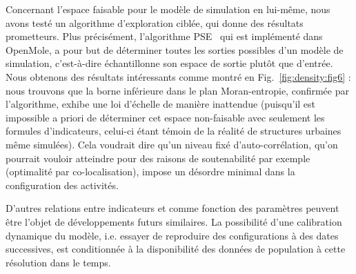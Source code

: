 {Concernant l'espace faisable pour le modèle de simulation en lui-même, nous avons testé un algorithme d'exploration ciblée, qui donne des résultats prometteurs. Plus précisément, l'algorithme PSE~\cite{10.1371/journal.pone.0138212} qui est implémenté dans OpenMole, a pour but de déterminer toutes les sorties possibles d'un modèle de simulation, c'est-à-dire échantillonne son espace de sortie plutôt que d'entrée. Nous obtenons des résultats intéressants comme montré en Fig.~\ref{fig:density:fig6} : nous trouvons que la borne inférieure dans le plan Moran-entropie, confirmée par l'algorithme, exhibe une loi d'échelle de manière inattendue (puisqu'il est impossible a priori de déterminer cet espace non-faisable avec seulement les formules d'indicateurs, celui-ci étant témoin de la réalité de structures urbaines même simulées). Cela voudrait dire qu'un niveau fixé d'auto-corrélation, qu'on pourrait vouloir atteindre pour des raisons de soutenabilité par exemple (optimalité par co-localisation), impose un désordre minimal dans la configuration des activités.

D'autres relations entre indicateurs et comme fonction des paramètres peuvent être l'objet de développements futurs similaires. La possibilité d'une calibration dynamique du modèle, i.e. essayer de reproduire des configurations à des dates successives, est conditionnée à la disponibilité des données de population à cette résolution dans le temps.
}


